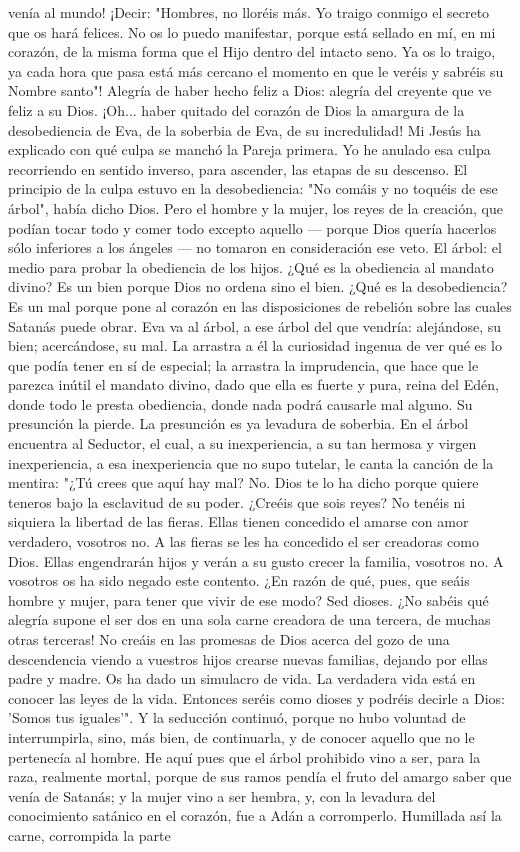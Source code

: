 \documentclass[12pt]{book} %
\begin{document}
venía al mundo! ¡Decir: "Hombres, no lloréis más. Yo traigo conmigo el secreto que os hará felices. No os lo puedo manifestar, porque está sellado en mí, en mi corazón, de la misma forma que el Hijo dentro del intacto seno. Ya os lo traigo, ya cada hora que pasa está más cercano el momento en que le veréis y sabréis su Nombre santo"! Alegría de haber hecho feliz a Dios: alegría del creyente que ve feliz a su Dios. ¡Oh... haber quitado del corazón de Dios la amargura de la desobediencia de Eva, de la soberbia de Eva, de su incredulidad! Mi Jesús ha explicado con qué culpa se manchó la Pareja primera. Yo he anulado esa culpa recorriendo en sentido inverso, para ascender, las etapas de su descenso. El principio de la culpa estuvo en la desobediencia: "No comáis y no toquéis de ese árbol", había dicho Dios. Pero el hombre y la mujer, los reyes de la creación, que podían tocar todo y comer todo excepto aquello — porque Dios quería hacerlos sólo inferiores a los ángeles — no tomaron en consideración ese veto. El árbol: el medio para probar la obediencia de los hijos. ¿Qué es la obediencia al mandato divino? Es un bien porque Dios no ordena sino el bien. ¿Qué es la desobediencia? Es un mal porque pone al corazón en las disposiciones de rebelión sobre las cuales Satanás puede obrar. Eva va al árbol, a ese árbol del que vendría: alejándose, su bien; acercándose, su mal. La arrastra a él la curiosidad ingenua de ver qué es lo que podía tener en sí de especial; la arrastra la imprudencia, que hace que le parezca inútil el mandato divino, dado que ella es fuerte y pura, reina del Edén, donde todo le presta obediencia, donde nada podrá causarle mal alguno. Su presunción la pierde. La presunción es ya levadura de soberbia. En el árbol encuentra al Seductor, el cual, a su inexperiencia, a su tan hermosa y virgen inexperiencia, a esa inexperiencia que no supo tutelar, le canta la canción de la mentira: "¿Tú crees que aquí hay mal? No. Dios te lo ha dicho porque quiere teneros bajo la esclavitud de su poder. ¿Creéis que sois reyes? No tenéis ni siquiera la libertad de las fieras. Ellas tienen concedido el amarse con amor verdadero, vosotros no. A las fieras se les ha concedido el ser creadoras como Dios. Ellas engendrarán hijos y verán a su gusto crecer la familia, vosotros no. A vosotros os ha sido negado este contento. ¿En razón de qué, pues, que seáis hombre y mujer, para tener que vivir de ese modo? Sed dioses. ¿No sabéis qué alegría supone el ser dos en una sola carne creadora de una tercera, de muchas otras terceras! No creáis en las promesas de Dios acerca del gozo de una descendencia viendo a vuestros hijos crearse nuevas familias, dejando por ellas padre y madre. Os ha dado un simulacro de vida. La verdadera vida está en conocer las leyes de la vida. Entonces seréis como dioses y podréis decirle a Dios: 'Somos tus iguales'". Y la seducción continuó, porque no hubo voluntad de interrumpirla, sino, más bien, de continuarla, y de conocer aquello que no le pertenecía al hombre. He aquí pues que el árbol prohibido vino a ser, para la raza, realmente mortal, porque de sus ramos pendía el fruto del amargo saber que venía de Satanás; y la mujer vino a ser hembra, y, con la levadura del conocimiento satánico en el corazón, fue a Adán a corromperlo. Humillada así la carne, corrompida la parte 
\end{document}
